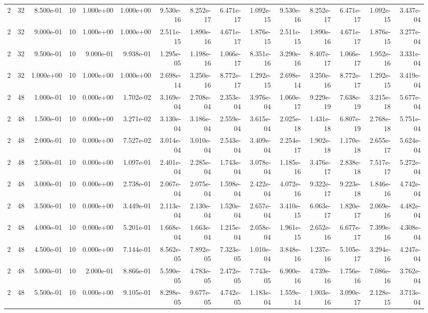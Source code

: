 \begin{tabular}{rrrrrrrrrrrrrrr}
2 & 32 & 8.500e-01 & 10 & 1.000e+00 & 1.000e+00 & 9.530e-16 & 8.252e-17 & 6.471e-17 & 1.092e-15 & 9.530e-16 & 8.252e-17 & 6.471e-17 & 1.092e-15 & 3.437e-04 \\
2 & 32 & 9.000e-01 & 10 & 1.000e+00 & 1.000e+00 & 2.511e-15 & 1.890e-16 & 4.671e-17 & 1.876e-15 & 2.511e-15 & 1.890e-16 & 4.671e-17 & 1.876e-15 & 3.277e-04 \\
2 & 32 & 9.500e-01 & 10 & 9.000e-01 & 9.938e-01 & 1.295e-05 & 1.198e-16 & 1.066e-17 & 8.351e-16 & 3.290e-16 & 8.407e-17 & 1.066e-17 & 1.952e-16 & 3.331e-04 \\
2 & 32 & 1.000e+00 & 10 & 1.000e+00 & 1.000e+00 & 2.698e-14 & 3.250e-16 & 8.772e-17 & 1.292e-15 & 2.698e-14 & 3.250e-16 & 8.772e-17 & 1.292e-15 & 3.419e-04 \\
2 & 48 & 1.000e-01 & 10 & 0.000e+00 & 1.702e-02 & 3.169e-04 & 2.708e-04 & 2.353e-04 & 3.976e-04 & 1.060e-17 & 9.229e-19 & 7.638e-19 & 3.215e-18 & 5.677e-04 \\
2 & 48 & 1.500e-01 & 10 & 0.000e+00 & 3.271e-02 & 3.130e-04 & 3.186e-04 & 2.559e-04 & 3.615e-04 & 2.025e-18 & 1.431e-18 & 6.807e-19 & 2.768e-18 & 5.751e-04 \\
2 & 48 & 2.000e-01 & 10 & 0.000e+00 & 7.527e-02 & 3.014e-04 & 3.010e-04 & 2.543e-04 & 3.409e-04 & 2.254e-17 & 1.902e-18 & 1.170e-18 & 2.655e-17 & 5.624e-04 \\
2 & 48 & 2.500e-01 & 10 & 0.000e+00 & 1.097e-01 & 2.401e-04 & 2.285e-04 & 1.743e-04 & 3.078e-04 & 1.185e-16 & 3.476e-17 & 2.838e-18 & 7.517e-17 & 5.272e-04 \\
2 & 48 & 3.000e-01 & 10 & 0.000e+00 & 2.738e-01 & 2.067e-04 & 2.075e-04 & 1.598e-04 & 2.422e-04 & 4.072e-16 & 9.322e-17 & 9.223e-18 & 1.846e-16 & 4.742e-04 \\
2 & 48 & 3.500e-01 & 10 & 0.000e+00 & 3.449e-01 & 2.113e-04 & 2.130e-04 & 1.520e-04 & 2.657e-04 & 3.410e-15 & 6.063e-17 & 1.820e-17 & 2.069e-16 & 4.482e-04 \\
2 & 48 & 4.000e-01 & 10 & 0.000e+00 & 5.201e-01 & 1.668e-04 & 1.663e-04 & 1.215e-04 & 2.058e-04 & 1.961e-15 & 2.652e-16 & 6.677e-17 & 7.399e-16 & 4.308e-04 \\
2 & 48 & 4.500e-01 & 10 & 0.000e+00 & 7.144e-01 & 8.562e-05 & 7.892e-05 & 7.323e-05 & 1.010e-04 & 3.848e-16 & 1.237e-16 & 5.105e-17 & 3.294e-16 & 4.247e-04 \\
2 & 48 & 5.000e-01 & 10 & 2.000e-01 & 8.866e-01 & 5.590e-05 & 4.783e-05 & 2.472e-05 & 7.743e-05 & 6.900e-16 & 4.739e-16 & 1.756e-16 & 7.086e-16 & 3.762e-04 \\
2 & 48 & 5.500e-01 & 10 & 0.000e+00 & 9.105e-01 & 8.298e-05 & 9.677e-05 & 4.742e-05 & 1.183e-04 & 1.559e-14 & 1.003e-16 & 3.090e-17 & 2.128e-15 & 3.713e-04 \\

\end{tabular}
